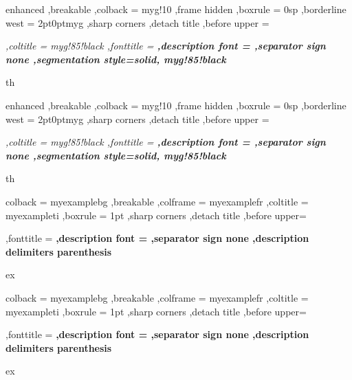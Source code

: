 {%
	enhanced
	,breakable
	,colback = myg!10
	,frame hidden
	,boxrule = 0sp
	,borderline west = {2pt}{0pt}{myg}
	,sharp corners
	,detach title
	,before upper = \tcbtitle\par\smallskip\noindent\itshape\setlength{\parindent}{1.5em}
	,coltitle = myg!85!black
	,fonttitle = \bfseries\sffamily
	,description font = \mdseries
	,separator sign none
	,segmentation style={solid, myg!85!black}
}
{th}

{%
	enhanced
	,breakable
	,colback = myg!10
	,frame hidden
	,boxrule = 0sp
	,borderline west = {2pt}{0pt}{myg}
	,sharp corners
	,detach title
	,before upper = \tcbtitle\par\smallskip\noindent\itshape\setlength{\parindent}{1.5em}
	,coltitle = myg!85!black
	,fonttitle = \bfseries\sffamily
	,description font = \mdseries
	,separator sign none
	,segmentation style={solid, myg!85!black}
}
{th}


{%
	colback = myexamplebg
	,breakable
	,colframe = myexamplefr
	,coltitle = myexampleti
	,boxrule = 1pt
	,sharp corners
	,detach title
	,before upper=\tcbtitle\par\smallskip
	,fonttitle = \bfseries
	,description font = \mdseries
	,separator sign none
	,description delimiters parenthesis
}
{ex}

{%
	colback = myexamplebg
	,breakable
	,colframe = myexamplefr
	,coltitle = myexampleti
	,boxrule = 1pt
	,sharp corners
	,detach title
	,before upper=\tcbtitle\par\smallskip
	,fonttitle = \bfseries
	,description font = \mdseries
	,separator sign none
	,description delimiters parenthesis
}
{ex}


